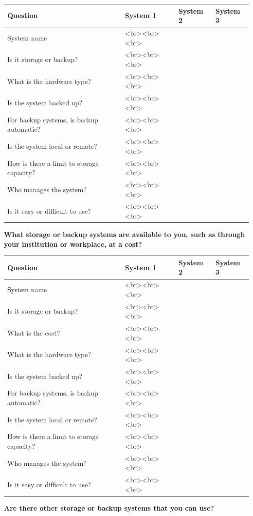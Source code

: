 \documentclass[
]{book}
\begin{document}
\begin{tabular}{l|l|l|l}
\hline
Question & System 1 & System 2 & System 3\\
\hline
System name & <br><br><br> &  & \\
\hline
Is it storage or backup? & <br><br><br> &  & \\
\hline
What is the hardware type? & <br><br><br> &  & \\
\hline
Is the system backed up? & <br><br><br> &  & \\
\hline
For backup systems, is backup automatic? & <br><br><br> &  & \\
\hline
Is the system local or remote? & <br><br><br> &  & \\
\hline
How is there a limit to storage capacity? & <br><br><br> &  & \\
\hline
Who manages the system? & <br><br><br> &  & \\
\hline
Is it easy or difficult to use? & <br><br><br> &  & \\
\hline
\end{tabular}

\textbf{What storage or backup systems are available to you, such as through your institution or workplace, at a cost?}

\begin{tabular}{l|l|l|l}
\hline
Question & System 1 & System 2 & System 3\\
\hline
System name & <br><br><br> &  & \\
\hline
Is it storage or backup? & <br><br><br> &  & \\
\hline
What is the cost? & <br><br><br> &  & \\
\hline
What is the hardware type? & <br><br><br> &  & \\
\hline
Is the system backed up? & <br><br><br> &  & \\
\hline
For backup systems, is backup automatic? & <br><br><br> &  & \\
\hline
Is the system local or remote? & <br><br><br> &  & \\
\hline
How is there a limit to storage capacity? & <br><br><br> &  & \\
\hline
Who manages the system? & <br><br><br> &  & \\
\hline
Is it easy or difficult to use? & <br><br><br> &  & \\
\hline
\end{tabular}

\textbf{Are there other storage or backup systems that you can use? }
\end{document}
